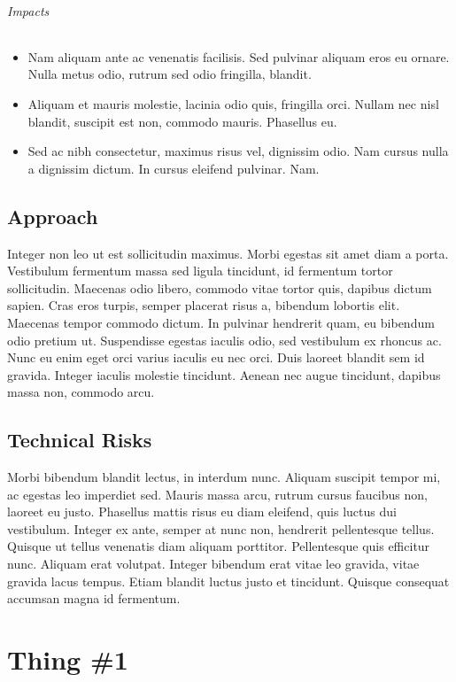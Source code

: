 			\subparagraph{Impacts} 
				\begin{itemize}
					\item Nam aliquam ante ac venenatis facilisis. Sed pulvinar aliquam eros eu ornare. Nulla metus odio, rutrum sed odio fringilla, blandit.
					\item Aliquam et mauris molestie, lacinia odio quis, fringilla orci. Nullam nec nisl blandit, suscipit est non, commodo mauris. Phasellus eu.
					\item Sed ac nibh consectetur, maximus risus vel, dignissim odio. Nam cursus nulla a dignissim dictum. In cursus eleifend pulvinar. Nam.
				\end{itemize}

\section{Approach}
Integer non leo ut est sollicitudin maximus. Morbi egestas sit amet diam a porta. Vestibulum fermentum massa sed ligula tincidunt, id fermentum tortor sollicitudin. Maecenas odio libero, commodo vitae tortor quis, dapibus dictum sapien. Cras eros turpis, semper placerat risus a, bibendum lobortis elit. Maecenas tempor commodo dictum. In pulvinar hendrerit quam, eu bibendum odio pretium ut. Suspendisse egestas iaculis odio, sed vestibulum ex rhoncus ac. Nunc eu enim eget orci varius iaculis eu nec orci. Duis laoreet blandit sem id gravida. Integer iaculis molestie tincidunt. Aenean nec augue tincidunt, dapibus massa non, commodo arcu.

\section{Technical Risks}
Morbi bibendum blandit lectus, in interdum nunc. Aliquam suscipit tempor mi, ac egestas leo imperdiet sed. Mauris massa arcu, rutrum cursus faucibus non, laoreet eu justo. Phasellus mattis risus eu diam eleifend, quis luctus dui vestibulum. Integer ex ante, semper at nunc non, hendrerit pellentesque tellus. Quisque ut tellus venenatis diam aliquam porttitor. Pellentesque quis efficitur nunc. Aliquam erat volutpat. Integer bibendum erat vitae leo gravida, vitae gravida lacus tempus. Etiam blandit luctus justo et tincidunt. Quisque consequat accumsan magna id fermentum.


\chapter{Thing \#1}

